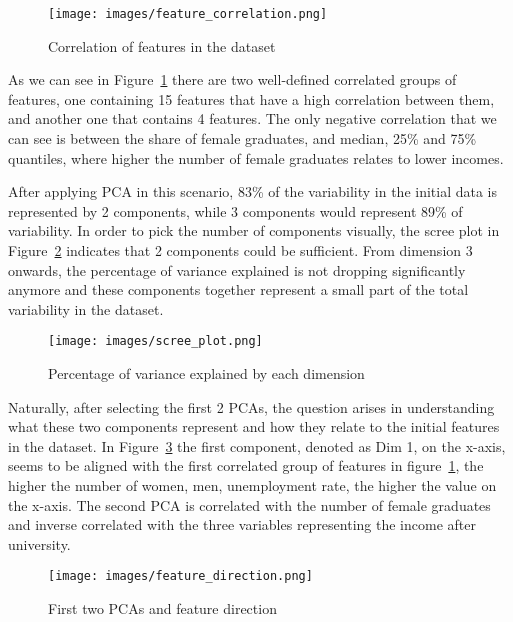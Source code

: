 \documentclass[11pt]{article}
\begin{document}
\begin{figure} [H]
    \begin{center}
        \texttt{[image: images/feature\_correlation.png]}
        \caption{Correlation of features in the dataset}
        \label{fig:featurecorrelation}
    \end{center}
\end{figure}

As we can see in Figure~\ref{fig:featurecorrelation} there are two well-defined correlated groups of features, one containing 15 features that have a high correlation between them, and another one that contains 4 features. The only negative correlation that we can see is between the share of female graduates, and median, 25\% and 75\% quantiles, where higher the number of female graduates relates to lower incomes.

After applying PCA in this scenario, 83\% of the variability in the initial data is represented by 2 components, while 3 components would represent 89\% of variability. In order to pick the number of components visually, the scree plot in Figure~\ref{fig:screeplot} indicates that 2 components could be sufficient. From dimension 3 onwards, the percentage of variance explained is not dropping significantly anymore and these components together represent a small part of the total variability in the dataset.

\begin{figure} [H]
    \begin{center}
        \texttt{[image: images/scree\_plot.png]}
        \caption{Percentage of variance explained by each dimension}
        \label{fig:screeplot}
    \end{center}
\end{figure}

Naturally, after selecting the first 2 PCAs, the question arises in understanding what these two components represent and how they relate to the initial features in the dataset. In Figure~\ref{fig:featuredirection} the first component, denoted as Dim 1, on the x-axis, seems to be aligned with the first correlated group of features in figure~\ref{fig:featurecorrelation}, the higher the number of women, men, unemployment rate, the higher the value on the x-axis. The second PCA is correlated with the number of female graduates and inverse correlated with the three variables representing the income after university.

\begin{figure} [H]
    \begin{center}
        \texttt{[image: images/feature\_direction.png]}
        \caption{First two PCAs and feature direction}
        \label{fig:featuredirection}
    \end{center}
\end{figure}
\end{document}
